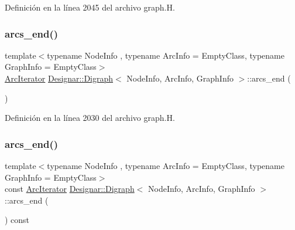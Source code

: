 Definición en la línea 2045 del archivo graph.\+H.

\mbox{\label{class_designar_1_1_digraph_af4e39baa2e8370cfda5f61f551b3091f}} 
\subsubsection{\texorpdfstring{arcs\+\_\+end()}{arcs\_end()}\hspace{0.1cm}{\footnotesize\ttfamily [1/4]}}
{\footnotesize\ttfamily template$<$typename Node\+Info , typename Arc\+Info  = Empty\+Class, typename Graph\+Info  = Empty\+Class$>$ \\
\hyperlink{class_designar_1_1_digraph_1_1_arc_iterator}{Arc\+Iterator} \hyperlink{class_designar_1_1_digraph}{Designar\+::\+Digraph}$<$ Node\+Info, Arc\+Info, Graph\+Info $>$\+::arcs\+\_\+end (\begin{DoxyParamCaption}{ }\end{DoxyParamCaption})\hspace{0.3cm}{\ttfamily [inline]}}



Definición en la línea 2030 del archivo graph.\+H.

\mbox{\label{class_designar_1_1_digraph_a128df54ce973f5b1f956407a7f565bc3}} 
\subsubsection{\texorpdfstring{arcs\+\_\+end()}{arcs\_end()}\hspace{0.1cm}{\footnotesize\ttfamily [2/4]}}
{\footnotesize\ttfamily template$<$typename Node\+Info , typename Arc\+Info  = Empty\+Class, typename Graph\+Info  = Empty\+Class$>$ \\
const \hyperlink{class_designar_1_1_digraph_1_1_arc_iterator}{Arc\+Iterator} \hyperlink{class_designar_1_1_digraph}{Designar\+::\+Digraph}$<$ Node\+Info, Arc\+Info, Graph\+Info $>$\+::arcs\+\_\+end (\begin{DoxyParamCaption}{ }\end{DoxyParamCaption}) const\hspace{0.3cm}{\ttfamily [inline]}}



